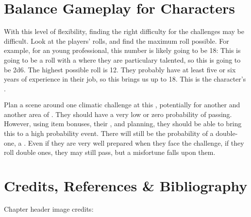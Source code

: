 \section{Balance Gameplay for Characters}

With this level of flexibility, finding the right difficulty for the challenges may be difficult. Look at the players' rolls, and find the maximum roll possible. For example, for an young professional,
this number is likely going to be 18: This is going to be a roll with a  where they are particulary talented, so this is going to be 2d6. The highest possible roll is 12. They probably have at least five or six years of experience in their job, so this brings us up to 18. This is the character's .

Plan a scene around one climatic challenge at this , potentially for another  and another area of . They should have a very low or zero probability of passing. However, using item bonuses, their , and planning, they should be able to bring this to a high probability event. There will still be the probability of a double-one, a . Even if they are very well prepared when they face the challenge, if they roll double ones, they may still pass, but a misfortune falls upon them.

\section*{Credits, References \& Bibliography}

Chapter header image credits: \cite{baby_faces}

\printbibliography[heading=none]
